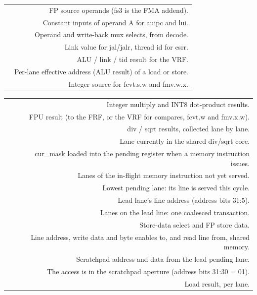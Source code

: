 \begin{minipage}[t]{0.245\linewidth}
\begin{tabularx}{\linewidth}[t]{@{}ND@{}}
 & FP source operands (fs3 is the FMA addend). \\
 & Constant inputs of operand A for auipc and lui. \\
 & Operand and write-back mux selects, from decode. \\
 & Link value for jal/jalr, thread id for csrr. \\
 & ALU / link / tid result for the VRF. \\
 & Per-lane effective address (ALU result) of a load or store. \\
 & Integer source for fcvt.s.w and fmv.w.x. \\
\end{tabularx}
\end{minipage}\hfill
\begin{minipage}[t]{0.245\linewidth}
\begin{tabularx}{\linewidth}[t]{@{}ND@{}}
 & Integer multiply and INT8 dot-product results. \\
 & FPU result (to the FRF, or the VRF for compares, fcvt.w and fmv.x.w). \\
 & div / sqrt results, collected lane by lane. \\
 & Lane currently in the shared div/sqrt core. \\
 & cur\_mask loaded into the pending register when a memory instruction issues. \\
 & Lanes of the in-flight memory instruction not yet served. \\
 & Lowest pending lane: its line is served this cycle. \\
 & Lead lane's line address (address bits 31:5). \\
 & Lanes on the lead line: one coalesced transaction. \\
 & Store-data select and FP store data. \\
 & Line address, write data and byte enables to, and read line from, shared memory. \\
 & Scratchpad address and data from the lead pending lane. \\
 & The access is in the scratchpad aperture (address bits 31:30 = 01). \\
 & Load result, per lane. \\

\end{tabularx}
\end{minipage}
